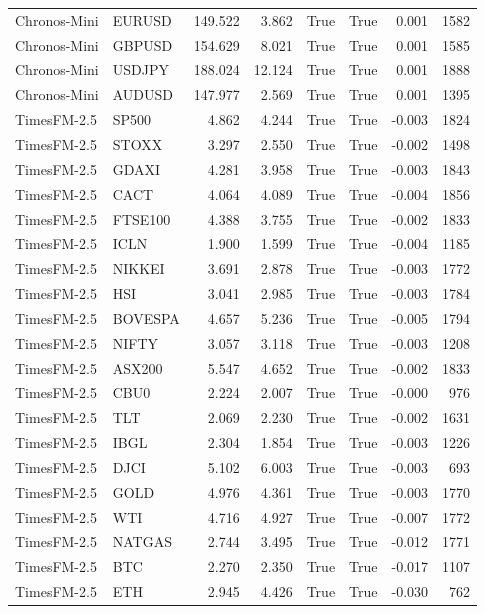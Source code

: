 \begin{table}[H]
\begin{tabular}{llrrrrrr}
Chronos-Mini & EURUSD & 149.522 & 3.862 & True & True & 0.001 & 1582 \\
Chronos-Mini & GBPUSD & 154.629 & 8.021 & True & True & 0.001 & 1585 \\
Chronos-Mini & USDJPY & 188.024 & 12.124 & True & True & 0.001 & 1888 \\
Chronos-Mini & AUDUSD & 147.977 & 2.569 & True & True & 0.001 & 1395 \\
TimesFM-2.5 & SP500 & 4.862 & 4.244 & True & True & -0.003 & 1824 \\
TimesFM-2.5 & STOXX & 3.297 & 2.550 & True & True & -0.002 & 1498 \\
TimesFM-2.5 & GDAXI & 4.281 & 3.958 & True & True & -0.003 & 1843 \\
TimesFM-2.5 & CACT & 4.064 & 4.089 & True & True & -0.004 & 1856 \\
TimesFM-2.5 & FTSE100 & 4.388 & 3.755 & True & True & -0.002 & 1833 \\
TimesFM-2.5 & ICLN & 1.900 & 1.599 & True & True & -0.004 & 1185 \\
TimesFM-2.5 & NIKKEI & 3.691 & 2.878 & True & True & -0.003 & 1772 \\
TimesFM-2.5 & HSI & 3.041 & 2.985 & True & True & -0.003 & 1784 \\
TimesFM-2.5 & BOVESPA & 4.657 & 5.236 & True & True & -0.005 & 1794 \\
TimesFM-2.5 & NIFTY & 3.057 & 3.118 & True & True & -0.003 & 1208 \\
TimesFM-2.5 & ASX200 & 5.547 & 4.652 & True & True & -0.002 & 1833 \\
TimesFM-2.5 & CBU0 & 2.224 & 2.007 & True & True & -0.000 & 976 \\
TimesFM-2.5 & TLT & 2.069 & 2.230 & True & True & -0.002 & 1631 \\
TimesFM-2.5 & IBGL & 2.304 & 1.854 & True & True & -0.003 & 1226 \\
TimesFM-2.5 & DJCI & 5.102 & 6.003 & True & True & -0.003 & 693 \\
TimesFM-2.5 & GOLD & 4.976 & 4.361 & True & True & -0.003 & 1770 \\
TimesFM-2.5 & WTI & 4.716 & 4.927 & True & True & -0.007 & 1772 \\
TimesFM-2.5 & NATGAS & 2.744 & 3.495 & True & True & -0.012 & 1771 \\
TimesFM-2.5 & BTC & 2.270 & 2.350 & True & True & -0.017 & 1107 \\
TimesFM-2.5 & ETH & 2.945 & 4.426 & True & True & -0.030 & 762 \\

\end{tabular}
\end{table}
